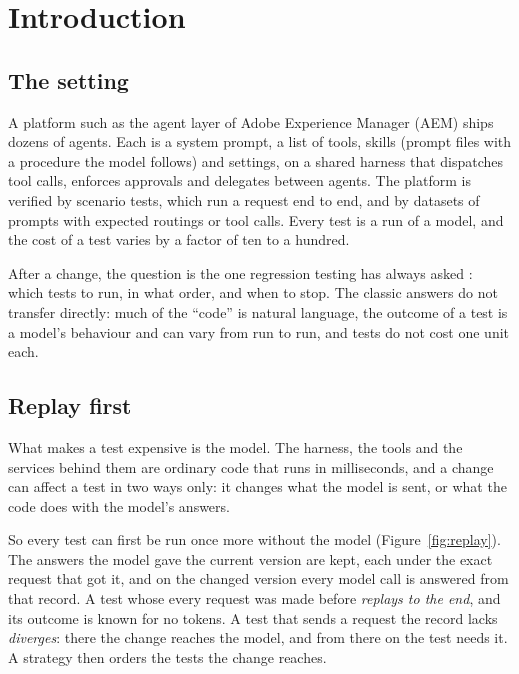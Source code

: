 \documentclass[11pt,a4paper]{article}
\begin{document}
\section{Introduction}
\label{sec:intro}

\subsection{The setting}

A platform such as the agent layer of Adobe Experience Manager (AEM) ships dozens of agents. Each is a system
prompt, a list of tools, skills (prompt files with a procedure the model follows) and settings, on a shared harness
that dispatches tool calls, enforces approvals and delegates between agents. The platform is verified by scenario
tests, which run a request end to end, and by datasets of prompts with expected routings or tool calls. Every test
is a run of a model, and the cost of a test varies by a factor of ten to a hundred.

After a change, the question is the one regression testing has always asked \cite{yoo2012regression}: which tests
to run, in what order, and when to stop. The classic answers \cite{rothermel1997safe,rothermel2001prioritizing}
do not transfer directly: much of the ``code'' is natural language, the outcome of a test is a model's behaviour
and can vary from run to run, and tests do not cost one unit each.

\subsection{Replay first}

What makes a test expensive is the model. The harness, the tools and the services behind them are ordinary code
that runs in milliseconds, and a change can affect a test in two ways only: it changes what the model is sent, or
what the code does with the model's answers.

So every test can first be run once more without the model (Figure~\ref{fig:replay}). The answers the model gave
the current version are kept, each under the exact request that got it, and on the changed version every model
call is answered from that record. A test whose every request was made before \emph{replays to the end}, and its
outcome is known for no tokens. A test that sends a request the record lacks \emph{diverges}: there the change
reaches the model, and from there on the test needs it. A strategy then orders the tests the change reaches.
\end{document}
